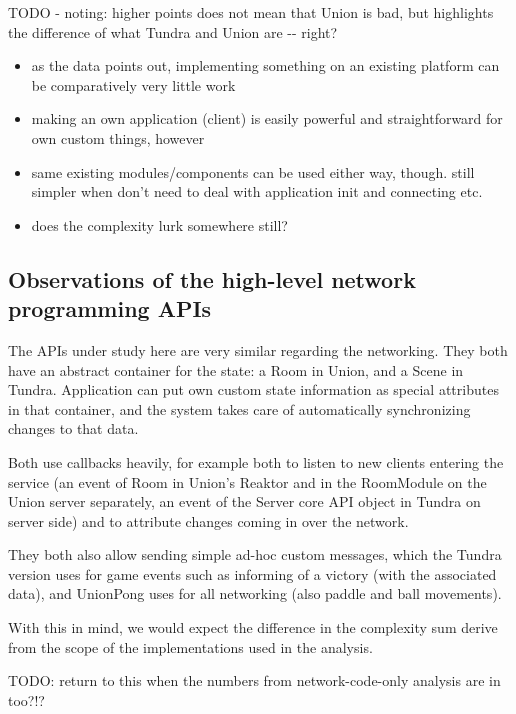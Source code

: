 \documentclass[conference]{IEEEtran}
\begin{document}
TODO - noting: higher points does not mean that Union is bad, but
highlights the difference of what Tundra and Union are -{}- right?
%
\begin{itemize}

\item as the data points out, implementing something on an existing
platform can be comparatively very little work

\item making an own application (client) is easily powerful and
straightforward for own custom things, however

\item same existing modules/components can be used either way,
though. still simpler when don't need to deal with application init
and connecting etc.

\item does the complexity lurk somewhere still?

\end{itemize}


\subsection{Observations of the high-level network programming APIs%
  \label{observations-of-the-high-level-network-programming-apis}%
}

The APIs under study here are very similar regarding the
networking. They both have an abstract container for the state: a Room
in Union, and a Scene in Tundra. Application can put own custom state
information as special attributes in that container, and the system
takes care of automatically synchronizing changes to that data.

Both use callbacks heavily, for example both to listen to new clients
entering the service (an event of Room in Union's Reaktor and in the
RoomModule on the Union server separately, an event of the Server core
API object in Tundra on server side) and to attribute changes coming
in over the network.

They both also allow sending simple ad-hoc custom messages, which the
Tundra version uses for game events such as informing of a victory
(with the associated data), and UnionPong uses for all networking
(also paddle and ball movements).

With this in mind, we would expect the difference in the complexity
sum derive from the scope of the implementations used in the analysis.

TODO: return to this when the numbers from network-code-only analysis are in too?!?
\end{document}
